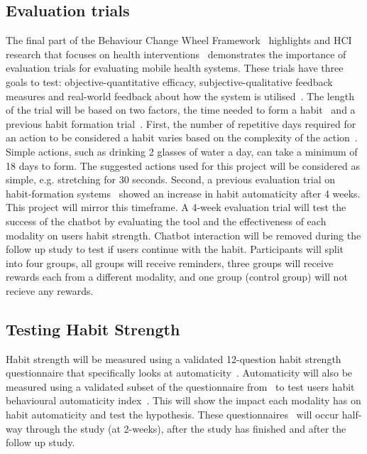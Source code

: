 \subsection{Evaluation trials}
The final part of the Behaviour Change Wheel Framework~\cite{article_behaviour_change_wheel} highlights and HCI research that focuses on health interventions~\cite{article_mhealth} demonstrates the importance of evaluation trials for evaluating mobile health systems. These trials have three goals to test: objective-quantitative efficacy, subjective-qualitative feedback measures and real-world feedback about how the system is utilised~\cite{article_evaluate_tech_health_behaviour_change}.\newline
\newline
The length of the trial will be based on two factors, the time needed to form a habit~\cite{article_how_habits_formed_modelling_habit_formation} and a previous habit formation trial~\cite{article_beyond_self_tracking_designing_apps}. First, the number of repetitive days required for an action to be considered a habit varies based on the complexity of the action~\cite{article_how_habits_formed_modelling_habit_formation}. Simple actions, such as drinking 2 glasses of water a day, can take a minimum of 18 days to form. The suggested actions used for this project will be considered as simple, e.g. stretching for 30 seconds. Second, a previous evaluation trial on habit-formation systems~\cite{article_how_habits_formed_modelling_habit_formation} showed an increase in habit automaticity after 4 weeks. This project will mirror this timeframe.\newline
\newline
A 4-week evaluation trial will test the success of the chatbot by evaluating the tool and the effectiveness of each modality on users habit strength. Chatbot interaction will be removed during the follow up study to test if users continue with the habit. Participants will split into four groups, all groups will receive reminders, three groups will receive rewards each from a different modality, and one group (control group) will not recieve any rewards.

\subsection{Testing Habit Strength}
Habit strength will be measured using a validated 12-question habit strength questionnaire that specifically looks at automaticity~\cite{article_habit_strength}. Automaticity will also be measured using a validated subset of the questionnaire from~\cite{article_habit_strength} to test users habit behavioural automaticity index~\cite{article_habit_measurement}. This will show the impact each modality has on habit automaticity and test the hypothesis. These questionnaires~\cite{article_habit_strength, article_habit_measurement} will occur half-way through the study (at 2-weeks), after the study has finished and after the follow up study.
